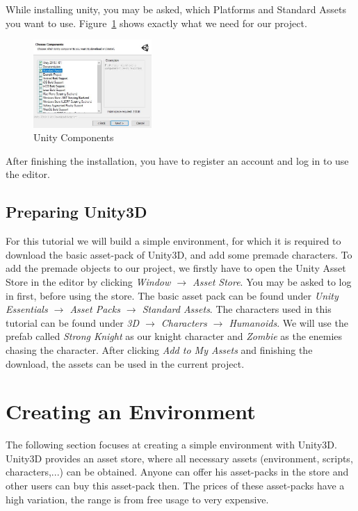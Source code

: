 \documentclass[12pt, a4paper, titlepage]{article}
\begin{document}
While installing unity, you may be asked, which Platforms and Standard Assets you want to use. Figure~\ref{fig:downloading_unity_components} shows exactly what we need for our project.

\begin{figure}[htbp]
  \centering
  \includegraphics[width=0.4\textwidth]{pictures/downloading_unity_components}
  \caption{Unity Components}
  \label{fig:downloading_unity_components}
\end{figure}

After finishing the installation, you have to register an account and log in to use the editor.

\subsection{Preparing Unity3D}
For this tutorial we will build a simple environment, for which it is required to download the basic asset-pack of Unity3D, and add some premade characters. To add the premade objects to our project, we firstly have to open the Unity Asset Store in the editor by clicking \emph{Window $\rightarrow$ Asset Store}. You may be asked to log in first, before using the store.
The basic asset pack can be found under \emph{Unity Essentials $\rightarrow$ Asset Packs $\rightarrow$ Standard Assets}. The characters used in this tutorial can be found under \emph{3D $\rightarrow$ Characters $\rightarrow$ Humanoids}. We will use the prefab called \emph{Strong Knight} as our knight character and \emph{Zombie} as the enemies chasing the character.
After clicking \emph{Add to My Assets} and finishing the download, the assets can be used in the current project.

\section{Creating an Environment}

The following section focuses at creating a simple environment with Unity3D. 
Unity3D provides an asset store, where all necessary assets (environment, scripts, characters,...) can be obtained. Anyone can offer his asset-packs in the store and other users can buy this asset-pack then. The prices of these asset-packs have a high variation, the range is from free usage to very expensive. 
 
\end{document}
